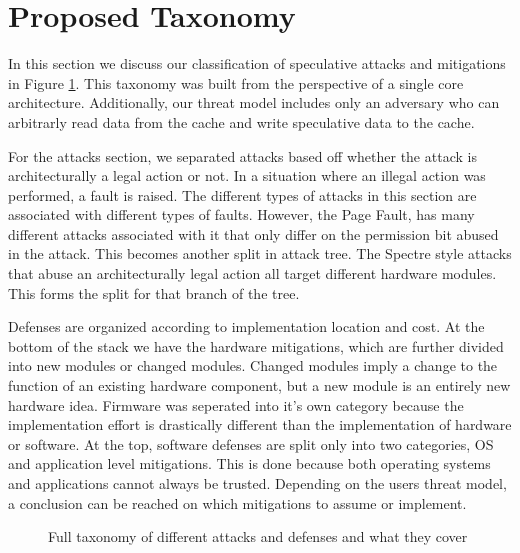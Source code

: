\section{Proposed Taxonomy} \label{Proposed Taxonomy}

In this section we discuss our classification of speculative attacks and mitigations in Figure \ref{fig:categorization}.
This taxonomy was built from the perspective of a single core architecture.
Additionally, our threat model includes only an adversary who can arbitrarly read data from the cache and write speculative data to the cache.

For the attacks section, we separated attacks based off whether the attack is architecturally a legal action or not.
In a situation where an illegal action was performed, a fault is raised.
The different types of attacks in this section are associated with different types of faults.
However, the Page Fault, has many different attacks associated with it that only differ on the permission bit abused in the attack.
This becomes another split in attack tree.
The Spectre style attacks that abuse an architecturally legal action all target different hardware modules.
This forms the split for that branch of the tree.

Defenses are organized according to implementation location and cost.
At the bottom of the stack we have the hardware mitigations, which are further divided into new modules or changed modules.
Changed modules imply a change to the function of an existing hardware component, but a new module is an entirely new hardware idea.
Firmware was seperated into it's own category because the implementation effort is drastically different than the implementation of hardware or software.
At the top, software defenses are split only into two categories, OS and application level mitigations.
This is done because both operating systems and applications cannot always be trusted.
Depending on the users threat model, a conclusion can be reached on which mitigations to assume or implement.

\begin{center}
\begin{figure}[hbtp]
    \caption{Full taxonomy of different attacks and defenses and what they cover}
    \label{fig:categorization}
\end{figure}
\afterpage{\clearpage}
\end{center}
